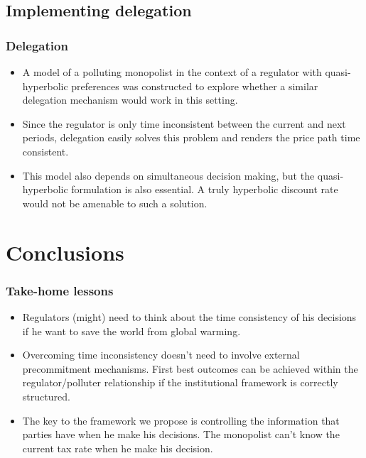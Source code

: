 \documentclass{beamer}
\begin{document}
\subsection{Implementing delegation}

\begin{frame}
  \frametitle{Delegation}
  \begin{itemize}
  \item<1-> A model of a polluting monopolist in the context of a
    regulator with quasi-hyperbolic preferences was constructed to
    explore whether a similar delegation mechanism would work in this setting.
  \item<2-> Since the regulator is only time inconsistent between the
    current and next periods, delegation easily solves this problem
    and renders the price path time consistent.
  \item<3-> This model also depends on simultaneous decision making,
    but the quasi-hyperbolic formulation is also essential. A truly
    hyperbolic discount rate would not be amenable to such a solution.
  \end{itemize}
\end{frame}


\section{Conclusions}

\begin{frame}
  \frametitle{Take-home lessons}
  \begin{itemize}
  \item<1-> Regulators (might) need to think about the time
    consistency of his decisions if he want to save the world from
    global warming.
  \item<2-> Overcoming time inconsistency doesn't need to involve
    external precommitment mechanisms. First best outcomes can be
    achieved within the regulator/polluter relationship if the
    institutional framework is correctly structured.
  \item<3-> The key to the framework we propose is controlling the
    information that parties have when he make his decisions. The
    monopolist can't know the current tax rate when he make his
    decision.
  \end{itemize}
\end{frame}
\end{document}
